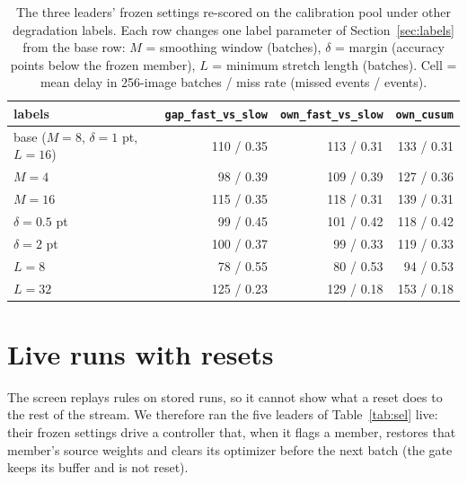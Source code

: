 \documentclass[10pt]{article}
\newcommand{\rl}[1]{\texttt{#1}}
\begin{document}
\begin{table}[ht]
  \centering\small
  \caption{The three leaders' frozen settings re-scored on the calibration pool under other degradation labels. Each row changes one label parameter of Section~\ref{sec:labels} from the base row: $M$ = smoothing window (batches), $\delta$ = margin (accuracy points below the frozen member), $L$ = minimum stretch length (batches). Cell = mean delay in 256-image batches / miss rate (missed events / events).}
  \label{tab:sens}
  \begin{tabular}{lrrr}
    \toprule
    labels & \rl{gap\_fast\_vs\_slow} & \rl{own\_fast\_vs\_slow} & \rl{own\_cusum} \\
    \midrule
    base ($M{=}8$, $\delta{=}1$ pt, $L{=}16$) & 110 / 0.35 & 113 / 0.31 & 133 / 0.31 \\
    $M = 4$ & 98 / 0.39 & 109 / 0.39 & 127 / 0.36 \\
    $M = 16$ & 115 / 0.35 & 118 / 0.31 & 139 / 0.31 \\
    $\delta = 0.5$ pt & 99 / 0.45 & 101 / 0.42 & 118 / 0.42 \\
    $\delta = 2$ pt & 100 / 0.37 & 99 / 0.33 & 119 / 0.33 \\
    $L = 8$ & 78 / 0.55 & 80 / 0.53 & 94 / 0.53 \\
    $L = 32$ & 125 / 0.23 & 129 / 0.18 & 153 / 0.18 \\
    \bottomrule
  \end{tabular}
\end{table}

\section{Live runs with resets}\label{sec:live}
The screen replays rules on stored runs, so it cannot show what a reset does to the rest of the stream. We therefore ran the five leaders of Table~\ref{tab:sel} live: their frozen settings drive a controller that, when it flags a member, restores that member's source weights and clears its optimizer before the next batch (the gate keeps its buffer and is not reset).
\end{document}

